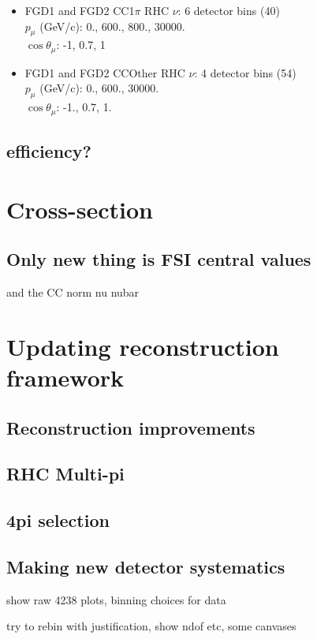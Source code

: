 \begin{itemize}
  \item FGD1 and FGD2 CC1$\pi$ RHC $\nu$: 6 detector bins (40) \\
    $p_\mu$ (GeV/c): 0., 600., 800., 30000. \\
    $\cos\theta_\mu$: -1, 0.7, 1 \\

  \item FGD1 and FGD2 CCOther RHC $\nu$: 4 detector bins (54)\\
    $p_\mu$ (GeV/c): 0., 600., 30000. \\
    $\cos\theta_\mu$: -1., 0.7, 1. \\
\end{itemize}

\subsection{efficiency?}

\section{Cross-section}
\subsection{Only new thing is FSI central values}
and the CC norm nu nubar
\section{Updating reconstruction framework}
\subsection{Reconstruction improvements}
\subsection{RHC Multi-pi}
\subsection{4pi selection}

\subsection{Making new detector systematics}

show raw 4238 plots, binning choices for data

try to rebin with justification, show ndof etc, some canvases



